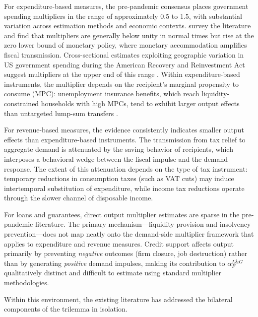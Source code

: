 For expenditure-based measures, the pre-pandemic consensus places government spending multipliers in the range of approximately 0.5 to 1.5, with substantial variation across estimation methods and economic contexts. \cite{ramey2018} survey the literature and find that multipliers are generally below unity in normal times but rise at the zero lower bound of monetary policy, where monetary accommodation amplifies fiscal transmission. Cross-sectional estimates exploiting geographic variation in US government spending during the American Recovery and Reinvestment Act suggest multipliers at the upper end of this range \citep{ARRA_QUELLE}. Within expenditure-based instruments, the multiplier depends on the recipient's marginal propensity to consume (MPC): unemployment insurance benefits, which reach liquidity-constrained households with high MPCs, tend to exhibit larger output effects than untargeted lump-sum transfers \citep{fariae2020, bayer2020}.

For revenue-based measures, the evidence consistently indicates smaller output effects than expenditure-based instruments. The transmission from tax relief to aggregate demand is attenuated by the saving behavior of recipients, which interposes a behavioral wedge between the fiscal impulse and the demand response. The extent of this attenuation depends on the type of tax instrument: temporary reductions in consumption taxes (such as VAT cuts) may induce intertemporal substitution of expenditure, while income tax reductions operate through the slower channel of disposable income.

For loans and guarantees, direct output multiplier estimates are sparse in the pre-pandemic literature. The primary mechanism---liquidity provision and insolvency prevention---does not map neatly onto the demand-side multiplier framework that applies to expenditure and revenue measures. Credit support affects output primarily by preventing \textit{negative} outcomes (firm closure, job destruction) rather than by generating \textit{positive} demand impulses, making its contribution to $\alpha_F^{L\&G}$ qualitatively distinct and difficult to estimate using standard multiplier methodologies.



Within this environment, the existing literature has addressed the bilateral
components of the trilemma in isolation.

